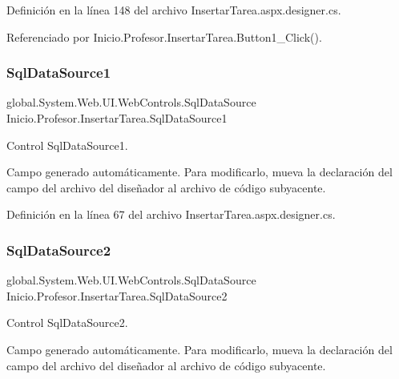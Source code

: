 Definición en la línea 148 del archivo Insertar\+Tarea.\+aspx.\+designer.\+cs.



Referenciado por Inicio.\+Profesor.\+Insertar\+Tarea.\+Button1\+\_\+\+Click().

\mbox{\label{classInicio_1_1Profesor_1_1InsertarTarea_a06e7fe0568bd32669aa769adced07cb4}} 
\subsubsection{\texorpdfstring{SqlDataSource1}{SqlDataSource1}}
{\footnotesize\ttfamily global.\+System.\+Web.\+U\+I.\+Web\+Controls.\+Sql\+Data\+Source Inicio.\+Profesor.\+Insertar\+Tarea.\+Sql\+Data\+Source1\hspace{0.3cm}{\ttfamily [protected]}}



Control Sql\+Data\+Source1. 

Campo generado automáticamente. Para modificarlo, mueva la declaración del campo del archivo del diseñador al archivo de código subyacente. 

Definición en la línea 67 del archivo Insertar\+Tarea.\+aspx.\+designer.\+cs.

\mbox{\label{classInicio_1_1Profesor_1_1InsertarTarea_aeff362eb964881337a984bbfc4b9aba9}} 
\subsubsection{\texorpdfstring{SqlDataSource2}{SqlDataSource2}}
{\footnotesize\ttfamily global.\+System.\+Web.\+U\+I.\+Web\+Controls.\+Sql\+Data\+Source Inicio.\+Profesor.\+Insertar\+Tarea.\+Sql\+Data\+Source2\hspace{0.3cm}{\ttfamily [protected]}}



Control Sql\+Data\+Source2. 

Campo generado automáticamente. Para modificarlo, mueva la declaración del campo del archivo del diseñador al archivo de código subyacente. 

